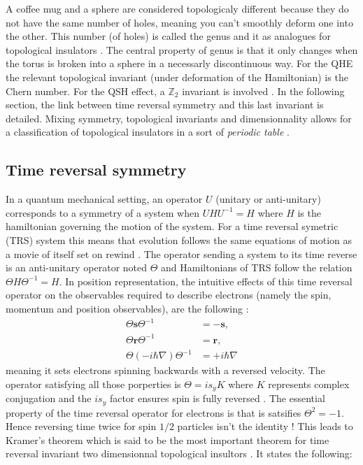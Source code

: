 A coffee mug and a sphere are considered topologicaly different because they do not have the same number of holes, meaning you can't smoothly deform one into the other. 
This number (of holes) is called the genus and it as analogues for topological insulators \cite{batra_physics_2020}. The central property of genus is that it only changes when the torus is broken into a sphere in a necessarly discontinuous way. %
For the QHE the relevant topological invariant %
(under deformation of the Hamiltonian) is the Chern number. For the QSH effect, a $\mathbb{Z}_2$ invariant is involved \cite{kane_topological_2013}. In the following section, the link between time reversal symmetry and this last invariant is detailed.  Mixing symmetry, topological invariants and dimensionnality allows for a classification of topological insulators in a sort of \textit{periodic table} \cite{hasan_topological_2010}. 

\subsection{Time reversal symmetry}
In a quantum mechanical setting, an operator $U$ (unitary or anti-unitary) corresponds to a symmetry of a system when $U H U^{-1} = H$ where $H$ is the hamiltonian governing the motion of the system. For a time reversal symetric (TRS) system this means that evolution follows the same equations of motion as a movie of itself set on rewind \cite{shankar_topological_2018}. The operator sending a system to its time reverse is an anti-unitary operator noted $\Theta$ and Hamiltonians of TRS follow the relation $\Theta H \Theta^{-1} = H$. In position representation, the intuitive effects of this time reversal operator on the observables required to describe electrons (namely the spin, momentum and position observables), are the following \cite{shankar_topological_2018} : 
\begin{align*}
    \Theta \mathbf{s} \Theta^{-1} &=-\mathbf{s}, \\
    \Theta \mathbf{r} \Theta^{-1} &=\mathbf{r}, \\
    \Theta (-i\hbar\nabla) \Theta^{-1} &=+i\hbar\nabla
\end{align*}
meaning it sets electrons spinning backwards with a reversed velocity. The operator satisfying all those porperties is $\Theta = i s_y K$ where $K$ represents complex conjugation and the $i s_y$ factor ensures spin is fully reversed \cite{bernevig_topological_2013}. The essential property of the time reversal operator for electrons is that is satsifies $\Theta^2 = -1$. Hence reversing time twice for spin $1/2$ particles isn't the identity \cite{hasan_topological_2010}! This leads to Kramer's theorem which is said to be the most important theorem for time reversal invariant two dimensionnal topological insultors \cite{bernevig_topological_2013}. It states the following:\\

